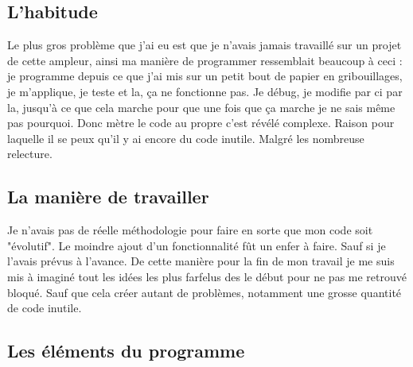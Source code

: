 \documentclass[10pt,a4paper]{article}
\begin{document}
\subsection{L'habitude} Le plus gros problème que j'ai eu est que je n'avais jamais travaillé sur un projet de cette ampleur, ainsi ma manière de programmer ressemblait beaucoup à ceci : je programme depuis ce que j'ai mis sur un petit bout de papier en gribouillages, je m'applique, je teste et la, ça ne fonctionne pas. Je débug, je modifie par ci par la, jusqu'à ce que cela marche pour que une fois que ça marche je ne sais même pas pourquoi. Donc mètre le code au propre c'est révélé complexe. Raison pour laquelle il se peux qu'il y ai encore du code inutile. Malgré les nombreuse relecture.
\subsection{La manière de travailler}
Je n'avais pas de réelle méthodologie pour faire en sorte que mon code soit "évolutif". Le moindre ajout d'un fonctionnalité fût un enfer à faire. Sauf si je l'avais prévus à l'avance. De cette manière pour la fin de mon travail je me suis mis à imaginé tout les idées les plus farfelus des le début pour ne pas me retrouvé bloqué. Sauf que cela créer autant de problèmes, notamment une grosse quantité de code inutile.
\subsection{Les éléments du programme }
\end{document}
